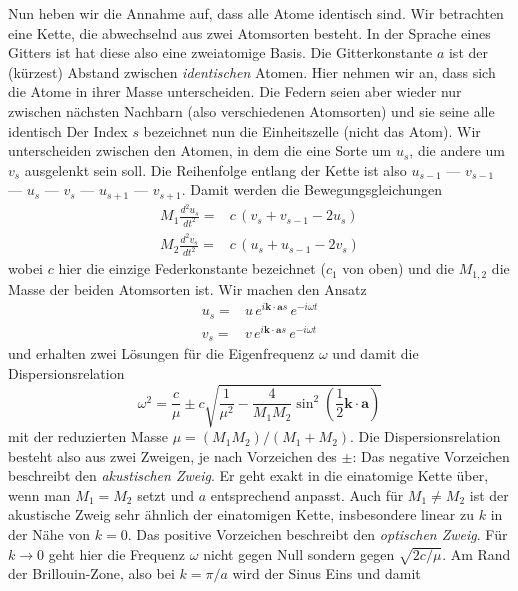 Nun heben wir die Annahme auf, dass alle Atome identisch sind. Wir betrachten eine Kette, die abwechselnd aus zwei Atomsorten besteht. In der Sprache eines Gitters ist hat diese also eine zweiatomige Basis. Die Gitterkonstante $a$ ist der (kürzest) Abstand zwischen \emph{identischen} Atomen. Hier nehmen wir an, dass sich die Atome in ihrer Masse unterscheiden. Die Federn seien aber wieder nur zwischen nächsten Nachbarn (also verschiedenen Atomsorten) und sie seine alle identisch Der Index $s$ bezeichnet nun die Einheitszelle (nicht das Atom). Wir unterscheiden zwischen den Atomen, in dem die eine Sorte um $u_s$, die andere um $v_s$ ausgelenkt sein soll.  Die Reihenfolge entlang der Kette ist also $u_{s-1}$ ---  $v_{s-1}$ --- $u_{s}$ ---  $v_{s}$ --- $u_{s+1}$ ---  $v_{s+1}$. Damit werden die Bewegungsgleichungen
\begin{align}
 M_1 \frac{d^2 u_s}{dt^2} = & c \, \left( v_s + v_{s-1} - 2 u_s \right) \\
 M_2 \frac{d^2 v_s}{dt^2} = & c \, \left( u_s + u_{s-1} - 2 v_s \right) 
\end{align}
wobei $c$ hier die einzige Federkonstante bezeichnet ($c_1$ von oben) und die $M_{1,2}$ die Masse der beiden Atomsorten ist.
Wir machen den Ansatz
\begin{align}
  u_s   = & u \,   e^{i \mathbf{k} \cdot \mathbf{a}  s} \, e^{-i \omega t} \\
  v_s  = & v  \, e^{i \mathbf{k} \cdot \mathbf{a}  s} \, e^{-i \omega t}
\end{align}
und erhalten zwei Lösungen für die Eigenfrequenz $\omega$ und damit die Dispersionsrelation
\begin{equation}
\omega^2 =  \frac{c}{\mu}
\pm c \sqrt{ \frac{1}{\mu^2} - \frac{4}{M_1 M_2}  \sin^2 \left( \frac{1}{2}  \mathbf{k} \cdot \mathbf{a} \right) } 
\end{equation}
mit der reduzierten Masse $\mu = (M_1  M_2)/(M_1 + M_2)$. Die Dispersionsrelation besteht also aus zwei Zweigen, je nach Vorzeichen des $\pm$: Das negative Vorzeichen beschreibt den \emph{akustischen Zweig}. Er geht exakt in die einatomige Kette über, wenn man $M_1 = M_2$ setzt und $a$ entsprechend anpasst. Auch für $M_1 \neq M_2$ ist der akustische Zweig sehr ähnlich der einatomigen Kette, insbesondere linear zu $k$ in der Nähe von $k=0$. Das positive Vorzeichen beschreibt den \emph{optischen Zweig}. Für $k \rightarrow 0$ geht hier die Frequenz $\omega$ nicht gegen Null sondern gegen $\sqrt{2 c / \mu}$. Am Rand der Brillouin-Zone, also bei $k = \pi /a $ wird der Sinus Eins und damit
